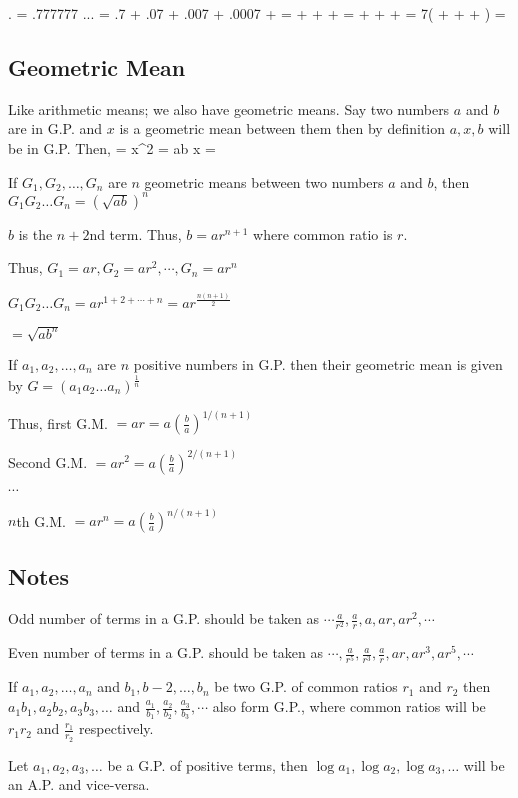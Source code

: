 \startformula . = .777777 ... \infty\stopformula
\startformula = .7 + .07 + .007 + .0007 + \cdots\stopformula
\startformula =  +  +  + \cdots\stopformula
\startformula =  +  +  + \cdots\stopformula
\startformula = 7\left( +  +  + \cdots\right)\stopformula
\startformula = \stopformula

\subsection{Geometric Mean}
Like arithmetic means; we also have geometric means. Say two numbers $a$ and $b$ are in G.P. and $x$ is a geometric mean between
them then by definition $a, x, b$ will be in G.P. Then,
\startformula {} = \stopformula
\startformula \Rightarrow x^2 = ab \Rightarrow x = \stopformula

If $G_1, G_2, \ldots, G_n$ are $n$ geometric means between two numbers $a$ and $b$, then $G_1G_2\ldots G_n = (\sqrt{ab})^n$

 $b$ is the $n + 2$nd term. Thus, $b = ar^{n + 1}$ where common ratio is $r$.

Thus, $G_1 = ar, G_2 = ar^2, \cdots, G_n = ar^n$

$G_1G_2\ldots G_n = ar^{1 + 2 + \cdots + n} = ar^{\frac{n(n + 1)}{2}}$

$= \sqrt{ab^n}$

If $a_1, a_2, \ldots, a_n$ are $n$ positive numbers in G.P. then their geometric mean is given by $G = (a_1a_2\ldots
a_n)^{\frac{1}{n}}$

Thus, first G.M. $= ar = a\left(\frac{b}{a}\right)^{1/(n + 1)}$

Second G.M. $= ar^2 = a\left(\frac{b}{a}\right)^{2/(n + 1)}$

$\cdots$

$n$th G.M. $= ar^{n} = a\left(\frac{b}{a}\right)^{n/(n + 1)}$
\subsection{Notes}
\startitemize[n]
\item Odd number of terms in a G.P. should be taken as $\cdots\frac{a}{r^2}, \frac{a}{r}, a, ar, ar^2, \cdots$
\item Even number of terms in a G.P. should be taken as $\cdots, \frac{a}{r^5}, \frac{a}{r^3}, \frac{a}{r}, ar, ar^3, ar^5, \cdots$
\item If $a_1, a_2, \ldots, a_n$ and $b_1, b-2, \ldots, b_n$ be two G.P. of common ratios $r_1$ and $r_2$ then $a_1b_1, a_2b_2,
  a_3b_3, \ldots$ and $\frac{a_1}{b_1}, \frac{a_2}{b_2}, \frac{a_3}{b_3}, \cdots$ also form G.P., where common ratios will be
  $r_1r_2$ and $\frac{r_1}{r_2}$ respectively.
\item Let $a_1, a_2, a_3, \ldots$ be a G.P. of positive terms, then $\log a_1, \log a_2, \log a_3, \ldots$ will be an A.P. and
  vice-versa.

